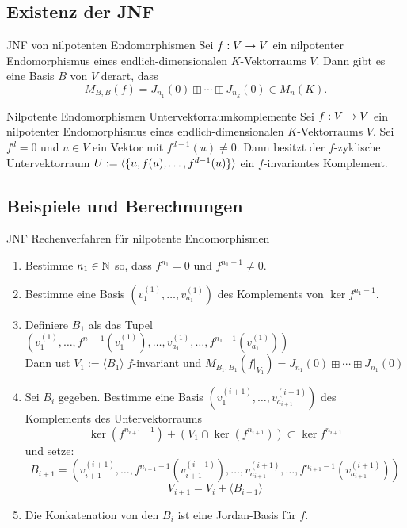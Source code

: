 \documentclass[main.tex]{subfiles}
\begin{document}
\subsection*{Existenz der JNF}

\begin{karte}{JNF von nilpotenten Endomorphismen}
    Sei \(f : V \rightarrow V\) ein nilpotenter Endomorphismus eines endlich-dimensionalen
    \(K\)-Vektorraums \(V\). Dann gibt es eine Basis \(B\) von \(V\) derart, dass
    \[ M_{B,B}(f) = J_{n_1}(0) \boxplus \cdots \boxplus J_{n_k}(0) \in M_n(K). \]
\end{karte}

\begin{karte}{Nilpotente Endomorphismen Untervektorraumkomplemente}
    Sei \(f : V \rightarrow V\) ein nilpotenter Endomorphismus eines endlich-dimensionalen
    \(K\)-Vektorraums \(V\). Sei \(f^d = 0\) und \(u \in V\) ein Vektor mit
    \(f^{d-1}(u) \neq 0\). Dann besitzt der \(f\)-zyklische Untervektorraum
    \(U := \langle \{u, f(u), \ldots, f^{d-1}(u)\}\rangle\) ein \(f\)-invariantes
    Komplement.
\end{karte}

\subsection*{Beispiele und Berechnungen}

\begin{karte}{JNF Rechenverfahren für nilpotente Endomorphismen}
    \begin{enumerate}
        \item Bestimme \(n_1 \in \mathbb{N}\) so, dass \(f^{n_1} = 0 \) und
        \(f^{n_1-1} \neq 0\).
        \item Bestimme eine Basis \((v^{(1)}_1,\ldots,v^{(1)}_{a_1})\)
        des Komplements von \(\ker f^{n_1-1}\).
        \item Definiere \(B_1\) als das Tupel\\
        \( \left(v_1^{(1)}, \ldots, f^{n_1-1}\left(v_1^{(1)}\right), \ldots,
        v_{a_1}^{(1)}, \ldots, f^{n_1-1}\left(v_{a_1}^{(1)}\right)\right) \)\\
        Dann ust \(V_1:=\langle B_1 \rangle \; f\)-invariant und
        \( M_{B_1,B_1}(f\vert_{V_1}) = J_{n_1}(0) \boxplus \cdots \boxplus J_{n_1}(0) \)
        \item Sei \(B_i\) gegeben. Bestimme eine Basis \((v_1^{(i+1)},\ldots, v_{a_{i+1}}^{(i+1)})\)
        des Komplements des Untervektorraums
        \[ \ker(f^{n_{i+1}-1}) + (V_1 \cap \ker(f^{n_{i+1}})) \subset \ker f^{n_{i+1}} \]
        und setze:
        \[ B_{i+1} = \left(v_{i+1}^{(i+1)}, \ldots, f^{n_{i+1}-1}\left(v_{i+1}^{(i+1)}\right), \ldots,
        v_{a_{i+1}}^{(i+1)}, \ldots, f^{n_{i+1}-1}\left(v_{a_{i+1}}^{(i+1)}\right)\right) \]
        \[ V_{i+1} = V_i + \langle B_{i+1} \rangle \]
        \item Die Konkatenation von den \(B_i\) ist eine Jordan-Basis für \(f\).
    \end{enumerate}    
\end{karte}
\end{document}
